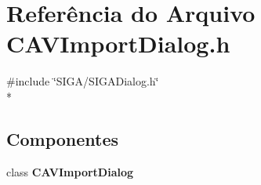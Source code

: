 \section{Referência do Arquivo C\+A\+V\+Import\+Dialog.\+h}
\label{_c_a_v_import_dialog_8h}
{\ttfamily \#include \char`\"{}S\+I\+G\+A/\+S\+I\+G\+A\+Dialog.\+h\char`\"{}}\\*
\subsection*{Componentes}
\begin{DoxyCompactItemize}
\item 
class {\bf C\+A\+V\+Import\+Dialog}
\end{DoxyCompactItemize}
